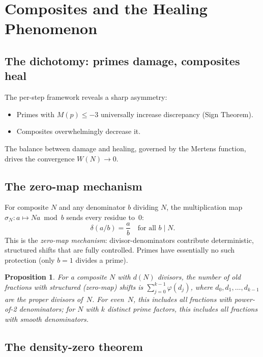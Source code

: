 \documentclass[11pt]{article}
\newtheorem{proposition}[theorem]{Proposition}
\theoremstyle{definition}
\begin{document}
\section{Composites and the Healing Phenomenon}\label{sec:composites}

\subsection{The dichotomy: primes damage, composites heal}
\label{sec:dichotomy}

The per-step framework reveals a sharp asymmetry:
\begin{itemize}
  \item Primes with $M(p) \le -3$ universally increase discrepancy
    (Sign Theorem).
  \item Composites overwhelmingly decrease it.
\end{itemize}

The balance between damage and healing, governed by the Mertens
function, drives the convergence $W(N) \to 0$.

\subsection{The zero-map mechanism}\label{sec:zero-map}

For composite $N$ and any denominator $b$ dividing $N$, the
multiplication map $\sigma_N \colon a \mapsto Na \bmod b$ sends
every residue to~$0$:
\[
  \delta(a/b) = \frac{a}{b} \quad\text{for all } b \mid N.
\]
This is the \emph{zero-map mechanism}: divisor-denominators
contribute deterministic, structured shifts that are fully
controlled.  Primes have essentially no such protection
(only $b = 1$ divides a prime).

\begin{proposition}\label{prop:composite-advantage}
For a composite $N$ with $d(N)$ divisors, the number of old fractions
with structured (zero-map) shifts is
$\sum_{j=0}^{k-1} \varphi(d_j)$,
where $d_0, d_1, \ldots, d_{k-1}$ are the proper divisors of~$N$.
For even~$N$, this includes all fractions with power-of-2
denominators; for $N$ with $k$ distinct prime factors, this
includes all fractions with smooth denominators.
\end{proposition}

\subsection{The density-zero theorem}\label{sec:density-zero}
\end{document}
